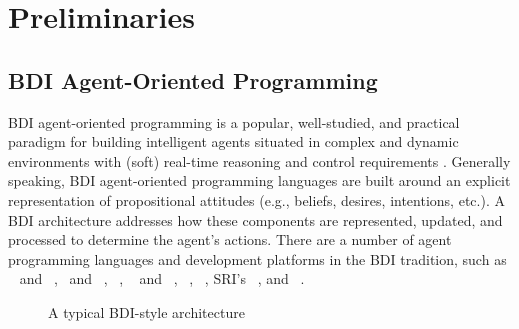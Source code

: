 \section{Preliminaries}\label{sec:preliminaries}

\newcommand{\success}{\mbox{\emph{succ}}}
\newcommand{\failure}{\mbox{\emph{fail}}}

\newcommand{\procedurefont}[1]{\mathsf{#1}}
\newcommand{\StableGoal}{\procedurefont{StableGoal}}
\newcommand{\RecordTrace}{\procedurefont{RecordFailedTrace}}
\newcommand{\RecordWorldDT}{\procedurefont{RecordWorldDT}}



\subsection{BDI Agent-Oriented Programming}\label{sec:bdi_programming}

BDI agent-oriented programming is a popular, well-studied, and practical paradigm
for building intelligent agents situated in complex and dynamic environments with
(soft) real-time reasoning and control requirements
\cite{Georgeff89-PRS,Benfield:AAMAS06}.
Generally speaking, BDI agent-oriented programming languages are built around an
explicit representation of propositional attitudes (e.g., beliefs, desires,
intentions, etc.). A BDI architecture addresses how these components are
represented, updated, and processed to determine the agent's actions.
There are a number of agent programming languages and development platforms in
the BDI tradition, such as \PRS~\cite{IngrandGR:IEEE92-PRS} and
\dMARS~\cite{Inverno:JAAMAS04-dMARS}, \AgentSpeak\ and
\JASON~\cite{Rao:LNCS96-AgentSpeak,Bordini:07-JASONBOOK},
\JADEX~\cite{PokahrBL:EXP03-JADEX},
\TAPL~\cite{Hindriks:JAAMAS99-3APL,DastaniRM:05} and
\DAPL~\cite{Dastani:JAAMAS08-2APL}, \GOAL~\cite{BoerHHM:JAPL07-GOAL},
\JACK~\cite{BusettaRHL:AL99-JACK}, SRI's \SPARK~\cite{MorelyM:AAMAS04-SPARK}, and
\JAM~\cite{Huber:AGENTS99-JAM}.



\begin{figure}[t]
\begin{center}
\resizebox{.9\textwidth}{!}{}
\end{center}
\caption{A typical BDI-style architecture}
\label{fig:bdiarch}
\end{figure}

